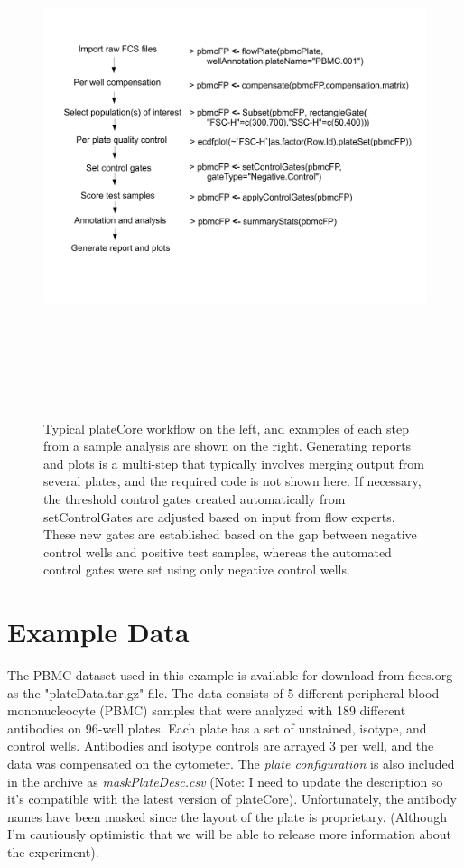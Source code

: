 \documentclass[12pt]{article}
\begin{document}
\begin{figure}
\centering
\includegraphics[width=7in,height=6in]{analysisSteps.pdf}
\caption{Typical plateCore workflow on the left, and examples of each step from a sample analysis are shown on the right.
Generating reports and plots is a multi-step that typically involves merging output from several plates, and the required
code is not shown here.
If necessary, the threshold control gates created automatically from setControlGates are adjusted based on input from flow experts. 
These new gates are established based on the gap between negative control wells and positive test samples, whereas the automated
control gates were set using only negative control wells.}
\label{fig:analysis}
\end{figure}
 
\clearpage
\section{Example Data}
The PBMC dataset used in this example is available for download from ficcs.org as the "plateData.tar.gz" file. The data consists
of 5 different peripheral blood mononucleocyte (PBMC) samples that were analyzed with 189 different antibodies on 96-well plates. Each plate has a set of
unstained, isotype, and control wells. Antibodies and isotype controls are arrayed 3 per well, and the data was compensated
on the cytometer. The \textit{plate configuration} is also included in the archive as \textit{maskPlateDesc.csv} (Note: I need
to update the description so it's compatible with the latest version of plateCore).
Unfortunately, the antibody names have been masked since the layout of the plate is proprietary. (Although
I'm cautiously optimistic that we will be able to release more information about the experiment).
\end{document}
